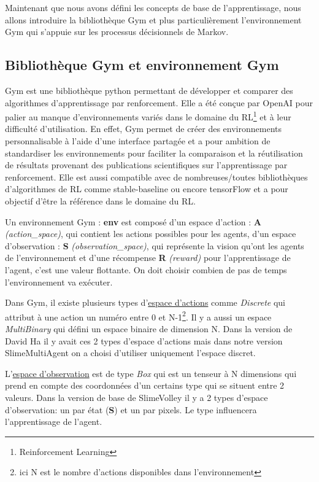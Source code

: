 \documentclass[11pt, a4paper]{article}
\begin{document}
	Maintenant que nous avons défini les concepts de base de l'apprentissage, nous allons introduire la bibliothèque Gym et plus particulièrement l'environnement Gym qui s'appuie sur les processus décisionnels de Markov.

	\subsection{Bibliothèque Gym et environnement Gym}

	Gym est une bibliothèque python permettant de développer et comparer des algorithmes d'apprentissage par renforcement. Elle a été conçue par OpenAI pour palier au manque d'environnements variés dans le domaine du RL\footnote{Reinforcement Learning} et à leur difficulté d'utilisation. En effet, Gym permet de créer des environnements personnalisable à l'aide d'une interface partagée et a pour ambition de standardiser les environnements pour faciliter la comparaison et la réutilisation de résultats provenant des publications scientifiques sur l'apprentissage par renforcement. Elle est aussi compatible avec de nombreuses/toutes bibliothèques d'algorithmes de RL comme stable-baseline ou encore tensorFlow et a pour objectif d'être la référence dans le domaine du RL\cite{openaigym}.

	\vspace{0.5cm}

	Un environnement Gym : \textbf{env} est composé d'un espace d'action : \textbf{A} \textit{(action\_space)}, qui contient les actions possibles pour les agents, d'un espace d'observation : \textbf{S} \textit{(observation\_space)}, qui représente la vision qu'ont les agents de l'environnement et d'une récompense \textbf{R} \textit{(reward)} pour l'apprentissage de l'agent, c'est une valeur flottante. On doit choisir combien de pas de temps l'environnement va exécuter.

	\vspace{0.5cm}

	Dans Gym, il existe plusieurs types d'\underline{espace d'actions} comme \textit{Discrete} qui attribut à une action un numéro entre 0 et N-1\footnote{ici N est le nombre d'actions disponibles dans l'environnement}. Il y a aussi un espace \textit{MultiBinary} qui défini un espace binaire de dimension N.
	Dans la version de David Ha il y avait ces 2 types d'espace d'actions mais dans notre version SlimeMultiAgent on a choisi d'utiliser uniquement l'espace discret.

	L'\underline{espace d'observation} est de type \textit{Box} qui est un tenseur à N dimensions qui prend en compte des coordonnées d'un certains type qui se situent entre 2 valeurs.
	Dans la version de base de SlimeVolley il y a 2 types d'espace d'observation: un par état (\textbf{S}) et un par pixels. Le type influencera l'apprentissage de l'agent.
\end{document}
